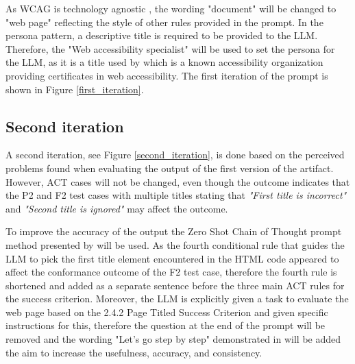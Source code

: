 As WCAG is technology agnostic \citep{wcag22}, the wording "document" will be changed to "web page" reflecting the style of other rules provided in the prompt. In the persona pattern, a descriptive title is required to be provided to the LLM. Therefore, the "Web accessibility specialist" will be used to set the persona for the LLM, as it is a title used by \textcite{web_accessibility_specialist} which is a known accessibility organization providing certificates in web accessibility. The first iteration of the prompt is shown in Figure \ref{first_iteration}.


\subsection{Second iteration}

A second iteration, see Figure \ref{second_iteration}, is done based on the perceived problems found when evaluating the output of the first version of the artifact. However, ACT cases will not be changed, even though the outcome indicates that the P2 and F2 test cases with multiple titles stating that \textit{"First title is incorrect"} and \textit{"Second title is ignored"} may affect the outcome.

To improve the accuracy of the output the Zero Shot Chain of Thought prompt method presented by \textcite{kojima2023large} will be used. As the fourth conditional rule that guides the LLM to pick the first title element encountered in the HTML code appeared to affect the conformance outcome of the F2 test case, therefore the fourth rule is shortened and added as a separate sentence before the three main ACT rules for the success criterion. Moreover, the LLM is explicitly given a task to evaluate the web page based on the 2.4.2 Page Titled Success Criterion and given specific instructions for this, therefore the question at the end of the prompt will be removed and the wording "Let's go step by step" demonstrated in \textcite{kojima2023large} will be added the aim to increase the usefulness, accuracy, and consistency.

